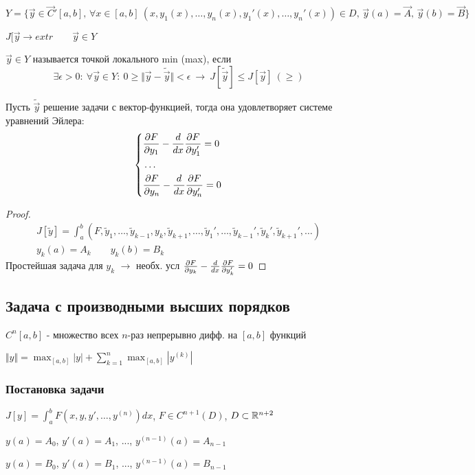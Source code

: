\documentclass{article}
\begin{document}
$Y=\{ \vec{y}\in \vec{C}'[a,b], \, \forall x\in [a,b] \ (x,y_1(x),\dots ,y_n(x), y_1'(x),\dots , y_n'(x)) \in D, \, \vec{y}(a)=\vec{A}, \, \vec{y}(b)=\vec{B}\}$

$J[\vec{y}\to extr \qquad \vec{y}\in Y$
\begin{definition}[Экстремум]
  $\vec{y} \in Y$ называется точкой локального min (max), если 
  \[
    \exists \epsilon > 0:\: \forall \vec{y} \in Y:\: 0 \ge \Vert \vec{y} - \tilde{\vec{y}} \Vert < \epsilon \ \rightarrow \ J[\tilde{\vec{y}}] \le J[\vec{y}] \ (\ge)
  \]
\end{definition}
\begin{theorem}
  Пусть $\tilde{\vec{y}}$ решение задачи с вектор-функцией,
  тогда она удовлетворяет системе уравнений Эйлера:
  \[
    \left\{\begin{aligned}
      & \frac{\partial{F}}{\partial{y_1}} - \frac{d}{dx}\frac{\partial{F}}{\partial{y_1'}}=0 \\
      & \dots \\
      & \frac{\partial{F}}{\partial{y_n}} - \frac{d}{dx}\frac{\partial{F}}{\partial{y_n'}}=0
    \end{aligned}\right.
  \]
\end{theorem}
\begin{proof}
  \begin{gather*}
    J[\tilde{y}]=\int_{a}^{b}(F, \tilde{y}_1,\dots , \tilde{y}_{k-1}, y_k, \tilde{y}_{k+1},\dots , \tilde{y}_1',\dots ,\tilde{y}_{k-1}', \tilde{y}_k', \tilde{y}_{k+1}', \dots ) \\ 
    y_k(a)=A_k \qquad y_k(b)=B_k
  \end{gather*}
  Простейшая задача для $y_k$ $\rightarrow$ необх. усл $\frac{\partial{F}}{\partial{y_k}}-\frac{d}{dx}\frac{\partial{F}}{\partial{y_k'}}=0$
\end{proof}
\subsection{Задача с производными высших порядков}
$C^{n}[a,b]$ - множество всех $n$-раз непрерывно дифф. на $[a,b]$ функций

$\Vert y \Vert = \max_{[a,b]}|y| + \sum_{k=1}^{n}\max_{[a,b]}|y^{(k)}|$
\subsubsection{Постановка задачи}
$J[y]=\int_{a}^{b}F(x,y,y', \dots , y^{(n)})dx$, $F\in C^{n+1}(D)$, $D \subset \mathbb{R}^{n+2}$

$y(a)=A_0$, $y'(a)=A_1$, ..., $y^{(n-1)}(a)=A_{n-1}$

$y(a)=B_0$, $y'(a)=B_1$, ..., $y^{(n-1)}(a)=B_{n-1}$
\end{document}
